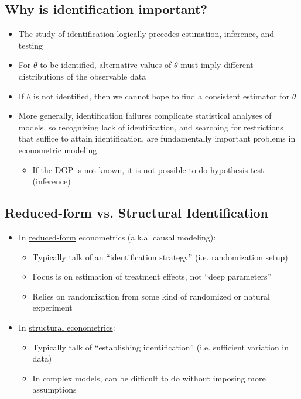\documentclass[11pt]{article}
\begin{document}
\subsection{Why is identification important?}
\label{sec:org817ce46}

\begin{itemize}
\item The study of identification logically precedes estimation, inference, and testing
\item For \(\theta\) to be identified, alternative values of \(\theta\) must imply different distributions of the observable data
\item If \(\theta\) is not identified, then we cannot hope to find a consistent estimator for \(\theta\)
\item More generally, identification failures complicate statistical analyses of models, so recognizing lack of identification, and searching for restrictions that suffice to attain identification, are fundamentally important problems in econometric modeling
\begin{itemize}
\item If the DGP is not known, it is not possible to do hypothesis test (inference)
\end{itemize}
\end{itemize}

\subsection{Reduced-form vs. Structural Identification}
\label{sec:orgb09b454}

\begin{itemize}
\item In \uline{reduced-form} econometrics (a.k.a. causal modeling):
\begin{itemize}
\item Typically talk of an ``identification strategy'' (i.e. randomization setup)
\item Focus is on estimation of treatment effects, not ``deep parameters''
\item Relies on randomization from some kind of randomized or natural experiment
\end{itemize}

\item In \uline{structural econometrics}:

\begin{itemize}
\item Typically talk of ``establishing identification'' (i.e. sufficient variation in data)
\item In complex models, can be difficult to do without imposing more assumptions
\end{itemize}
\end{itemize}
\end{document}
